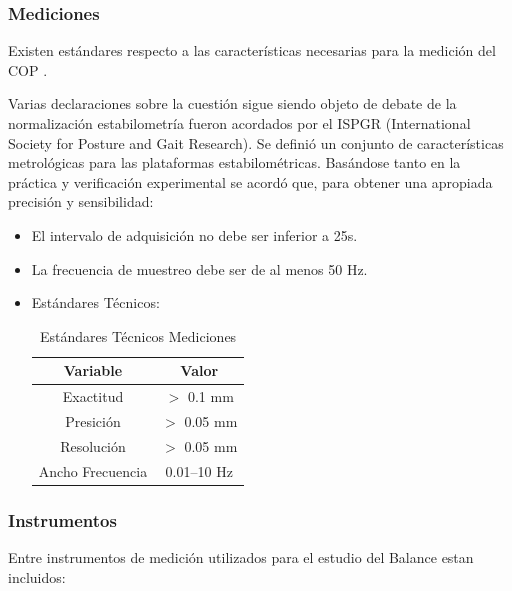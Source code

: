 \documentclass[12pt,a4paper]{article}
\begin{document}
\subsubsection{Mediciones} Existen estándares respecto a las características necesarias para la medición del COP \cite{scoppa_clinical_2013}.

Varias declaraciones sobre la cuestión sigue siendo objeto de debate de la normalización estabilometría fueron acordados por el ISPGR (International Society for Posture and Gait Research).
Se definió un conjunto de características metrológicas para las plataformas estabilométricas.
Basándose tanto en la práctica y verificación experimental se acordó que, para obtener una apropiada precisión y sensibilidad:
\begin{itemize}
	\item El intervalo de adquisición no debe ser inferior a 25s.
	\item La frecuencia de muestreo debe ser de al menos 50 Hz.
	\item Estándares Técnicos:
	\begin{table}[H]
		\centering
		\label{table:mediciones}
		\begin{tabular}{|c|c|}			
			\hline \textbf{Variable} & \textbf{Valor} 	\\ 
			\hline Exactitud 	& $>$ 0.1 mm 		\\ 
			\hline Presición 	& $>$ 0.05 mm 		\\ 
			\hline Resolución 	& $>$ 0.05 mm 		\\ 
			\hline Ancho Frecuencia & 0.01–10 Hz	\\ 
			\hline 			
		\end{tabular}
		\caption{Estándares Técnicos Mediciones}
	\end{table}	  
\end{itemize}

\subsubsection{Instrumentos} Entre instrumentos de medición utilizados para el estudio del Balance estan incluidos:
\end{document}
